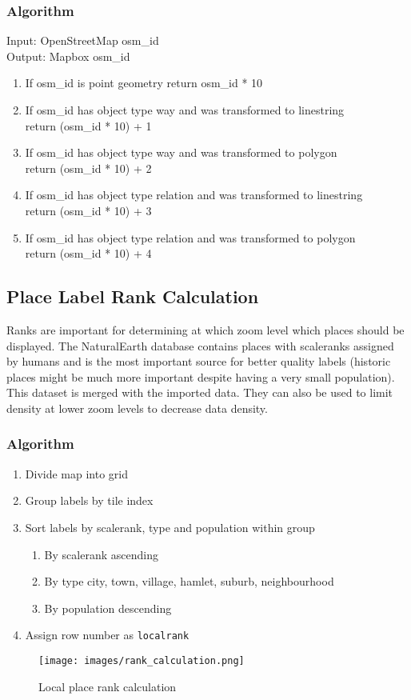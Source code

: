 \subsubsection*{Algorithm}
Input: OpenStreetMap osm\_id\\
Output: Mapbox osm\_id
\begin{enumerate}
    \item If osm\_id is point geometry return osm\_id * 10
    \item If osm\_id has object type way and was transformed to linestring\\
    return (osm\_id * 10) + 1
    \item If osm\_id has object type way and was transformed to polygon\\
    return (osm\_id * 10) + 2
    \item If  osm\_id has object type relation and was transformed to linestring\\
    return (osm\_id * 10) + 3
    \item If osm\_id has object type relation and was transformed to polygon\\
    return (osm\_id * 10) + 4
\end{enumerate}

\clearpage
\subsection{Place Label Rank Calculation}\label{place_label_rank_calc}

Ranks are important for determining at which zoom level which places should be displayed. The NaturalEarth database contains places with scaleranks assigned by humans and is the most important source for better quality labels (historic places might be much more important despite having a very small population). This dataset is merged with the imported \osm{} data.
They can also be used to limit density at lower zoom levels to decrease data density.

\subsubsection*{Algorithm}

\begin{enumerate}  
    \item Divide map into grid
    \item Group labels by tile index
    \item Sort labels by scalerank, type and population within group
    \begin{enumerate}
        \item By scalerank ascending
        \item By type city, town, village, hamlet, suburb, neighbourhood
        \item By population descending
    \end{enumerate}
    \item Assign row number as \texttt{localrank}
\end{enumerate}


\begin{figure}[H]
\centering
\texttt{[image: images/rank\_calculation.png]}
\caption{Local place rank calculation}
\end{figure}

